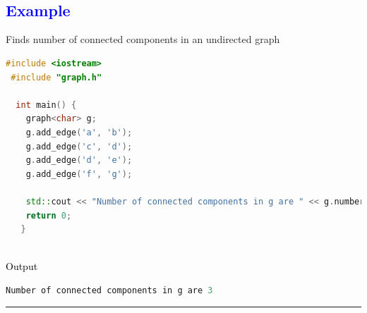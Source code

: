 \documentclass[11pt,a4paper]{article}
\begin{document}
\\
\\


\subsection*{\textcolor{blue}{\Large Example }}



Finds number of connected components in an undirected graph
\begin{lstlisting}[language=C++]
 #include <iostream>
 #include "graph.h"

  int main() {
    graph<char> g;
    g.add_edge('a', 'b');
    g.add_edge('c', 'd');
    g.add_edge('d', 'e');
    g.add_edge('f', 'g');

    std::cout << "Number of connected components in g are " << g.number_of_connected_components() << "\n";
    return 0;
   }   

\end{lstlisting}
\\
{\textcolor{black}{\normalsize Output }}
\begin{lstlisting}[language=C++]
Number of connected components in g are 3
\end{lstlisting}
\rule{17cm}{0.5mm}
\end{document}
